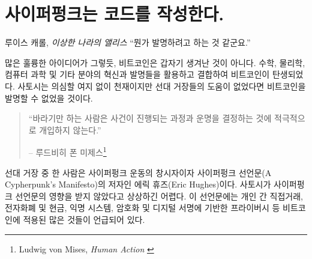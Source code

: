 \chapter{사이퍼펑크는 코드를 작성한다.}
\label{les:20}

\begin{chapquote}
	{루이스 캐롤, \textit{이상한 나라의 앨리스}}
	\enquote{뭔가 발명하려고 하는 것 같군요.}
\end{chapquote}

\begin{comment}
	Like many great ideas, Bitcoin didn't come out of nowhere. It was made
	possible by utilizing and combining many innovations and discoveries in
	mathematics, physics, computer science, and other fields. While
	undoubtedly a genius, Satoshi wouldn't have been able to invent Bitcoin
	without the giants on whose shoulders he was standing on.
\end{comment}
많은 훌륭한 아이디어가 그렇듯, 비트코인은 갑자기 생겨난 것이 아니다.
수학, 물리학, 컴퓨터 과학 및 기타 분야의 혁신과 발명들을 활용하고 결합하여 비트코인이 탄생되었다.
사토시는 의심할 여지 없이 천재이지만 선대 거장들의 도움이 없었다면 비트코인을 발명할 수 없었을 것이다.

\begin{quotation}\begin{samepage}
		\enquote{바라기만 하는 사람은 사건이 진행되는 과정과 운명을 결정하는 것에 적극적으로 개입하지 않는다.}
		\begin{flushright} -- 루드비히 폰 미제스\footnote{Ludwig von Mises, \textit{Human Action} \cite{human-action}}
\end{flushright}\end{samepage}\end{quotation}

\begin{comment}
	One of these giants is Eric Hughes, one of the founders of the cypherpunk
	movement and author of \textit{A Cypherpunk's Manifesto}. It's hard to imagine
	that Satoshi wasn't influenced by this manifesto. It speaks of many things which
	Bitcoin enables and utilizes, such as direct and private transactions,
	electronic money and cash, anonymous systems, and defending privacy with
	cryptography and digital signatures.
\end{comment}
선대 거장 중 한 사람은 사이퍼펑크 운동의 창시자이자 사이퍼펑크 선언문(A Cypherpunk's Manifesto)의 저자인 
에릭 휴즈(Eric Hughes)이다.
사토시가 사이퍼펑크 선언문의 영향을 받지 않았다고 상상하긴 어렵다.
이 선언문에는 개인 간 직접거래, 전자화폐 및 현금, 익명 시스템, 암호화 및 디지털 서명에 기반한 프라이버시 등 
비트코인에 적용된 많은 것들이 언급되어 있다.

